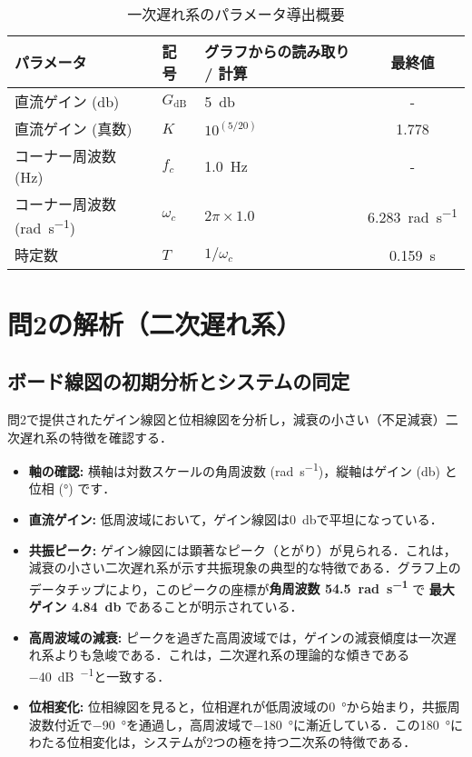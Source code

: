 \documentclass[11pt,a4paper]{ltjsarticle}
\newcommand{\supcite}[1]{\textsuperscript{\cite{#1}}}
\begin{document}
\begin{table}[htbp]
  \centering
  \caption{一次遅れ系のパラメータ導出概要}
  \label{tbl:param1}
  \begin{tabular}{@{}lllc@{}}
    \toprule
    パラメータ & 記号 & グラフからの読み取り / 計算 & 最終値 \\
    \midrule
    直流ゲイン (\si{\decibel}) & $G_{\text{dB}}$ & \SI{5}{\decibel} & - \\
    直流ゲイン (真数) & $K$ & $10^{(5/20)}$ & 1.778 \\
    コーナー周波数 (\si{\hertz}) & $f_c$ & \SI{1.0}{\hertz} & - \\
    コーナー周波数 (\si{\radian\per\second}) & $\omega_c$ & $2\pi \times 1.0$ & \SI{6.283}{\radian\per\second} \\
    時定数 & $T$ & $1/\omega_c$ & \SI{0.159}{\second} \\
    \bottomrule
  \end{tabular}
\end{table}

\section{問2の解析（二次遅れ系）}

\subsection{ボード線図の初期分析とシステムの同定}

問2で提供されたゲイン線図と位相線図を分析し，減衰の小さい（不足減衰）二次遅れ系の特徴を確認する\supcite{ref1}．

\begin{itemize}
    \item \textbf{軸の確認:} 横軸は対数スケールの角周波数 (\si{\radian\per\second})，縦軸はゲイン (\si{\decibel}) と位相 (\si{\degree}) です\supcite{ref1}．
    \item \textbf{直流ゲイン:} 低周波域において，ゲイン線図は\SI{0}{\decibel}で平坦になっている\supcite{ref1}．
    \item \textbf{共振ピーク:} ゲイン線図には顕著なピーク（とがり）が見られる．これは，減衰の小さい二次遅れ系が示す共振現象の典型的な特徴である\supcite{ref3}．グラフ上のデータチップにより，このピークの座標が\textbf{角周波数 \SI{54.5}{\radian\per\second}} で \textbf{最大ゲイン \SI{4.84}{\decibel}} であることが明示されている\supcite{ref1}．
    \item \textbf{高周波域の減衰:} ピークを過ぎた高周波域では，ゲインの減衰傾度は一次遅れ系よりも急峻である．これは，二次遅れ系の理論的な傾きである\SI{-40}{\dB\per\decade}と一致する\supcite{ref3}．
    \item \textbf{位相変化:} 位相線図を見ると，位相遅れが低周波域の\SI{0}{\degree}から始まり，共振周波数付近で\SI{-90}{\degree}を通過し，高周波域で\SI{-180}{\degree}に漸近している\supcite{ref7}．この\SI{180}{\degree}にわたる位相変化は，システムが2つの極を持つ二次系の特徴である．
\end{itemize}
\end{document}
